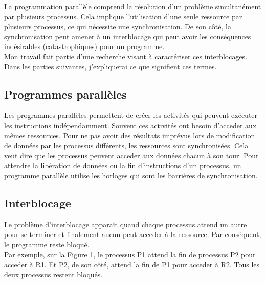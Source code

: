 \documentclass[12pt]{scrartcl}
\begin{document}
La programmation parallèle comprend la résolution d'un problème simultanément par plusieurs processus.
Cela implique l'utilisation d'une seule ressource par plusieurs processus, ce qui nécessite une synchronisation.
De son côté, la synchronisation peut amener à un interblocage qui peut avoir les conséquences indésirables (catastrophiques) pour un programme. \\
Mon travail fait partie d'une recherche visant à caractériser ces interblocages.\\
Dans les parties suivantes, j'expliquerai ce que signifient ces termes.   
\subsection{Programmes parallèles}

Les programmes parallèles permettent de créer les activités qui peuvent exécuter les instructions indépendamment. 
Souvent ces activités ont besoin d'acceder aux mêmes ressources. 
Pour ne pas avoir des résultats imprévus lors de modification de données par les processus différents, les ressources sont synchronisées. 
Cela veut dire que les processus peuvent acceder aux données chacun à son tour. 
Pour attendre la libération de données ou la fin d'instructions d'un processus, un programme parallèle utilise les horloges qui sont les barrières de synchronisation.
\newpage
\subsection{Interblocage}

Le problème d'interblocage apparaît quand chaque processus attend un autre pour se terminer et finalement aucun peut acceder à la ressource.
Par conséquent, le programme reste bloqué.\\

Par exemple, sur la Figure 1, le processus P1 attend la fin de processus P2 pour acceder à R1. Et P2, de son côté, attend la fin de P1 pour acceder à R2. Tous les deux processus restent bloqués.\\
\end{document}
